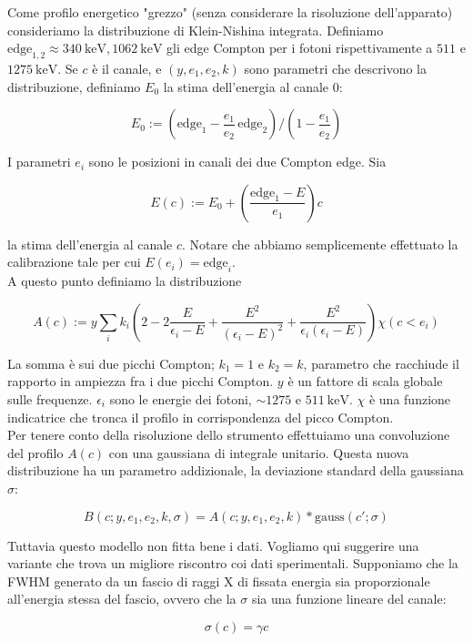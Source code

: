 \documentclass[a4paper,11pt,italian]{report}
\begin{document}
Come profilo energetico "grezzo" (senza considerare la risoluzione dell'apparato) consideriamo la distribuzione di Klein-Nishina integrata. Definiamo $\text{edge}_{1,2} \approx \SI{340}{\kilo\electronvolt}, \SI{1062}{\kilo\electronvolt}$ gli edge Compton per i fotoni rispettivamente a $511$ e $\SI{1275}{\kilo\electronvolt}$. Se $c$ è il canale, e $(y,e_1,e_2,k)$ sono parametri che descrivono la distribuzione, definiamo $E_0$ la stima dell'energia al canale $0$:

\[E_0 := \left(\text{edge}_1 - \frac{e_1}{e_2} \, \text{edge}_2\right)/\left(1-\frac{e_1}{e_2}\right) \]

I parametri $e_i$ sono le posizioni in canali dei due Compton edge. Sia

\[E(c) := E_0 + \left(\frac{\text{edge}_1 - E}{e_1}\right) c\]

la stima dell'energia al canale $c$. Notare che abbiamo semplicemente effettuato la calibrazione tale per cui $E(e_i) = \text{edge}_i$.\\

A questo punto definiamo la distribuzione

\[ A(c) := y \sum_i k_i \left( 2-2 \frac {E} {\epsilon_i - E} + \frac{E^2}{(\epsilon_i-E)^2} + \frac{E^2}{\epsilon_i (\epsilon_i-E)} \right) \chi(c<e_i) \]

La somma è sui due picchi Compton; $k_1 = 1$ e $k_2 = k$, parametro che racchiude il rapporto in ampiezza fra i due picchi Compton. $y$ è un fattore di scala globale sulle frequenze. $\epsilon_i$ sono le energie dei fotoni, $\sim 1275$ e $\SI{511}{\kilo\electronvolt}$. $\chi$ è una funzione indicatrice che tronca il profilo in corrispondenza del picco Compton.\\

Per tenere conto della risoluzione dello strumento effettuiamo una convoluzione del profilo $A(c)$ con una gaussiana di integrale unitario. Questa nuova distribuzione ha un parametro addizionale, la deviazione standard della gaussiana $\sigma$:

\[ B(c;y,e_1,e_2,k,\sigma) = A(c;y,e_1,e_2,k) * \text{gauss}(c';\sigma) \]

Tuttavia questo modello non fitta bene i dati. Vogliamo qui suggerire una variante che trova un migliore riscontro coi dati sperimentali. Supponiamo che la FWHM generato da un fascio di raggi X di fissata energia sia proporzionale all'energia stessa del fascio, ovvero che la $\sigma$ sia una funzione lineare del canale:

\[ \sigma(c) = \gamma c \]
\end{document}
